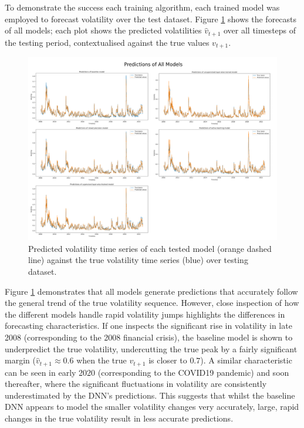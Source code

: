 \documentclass[a4paper, 11pt]{report}
\begin{document}
    To demonstrate the success each training algorithm, each trained model was employed to forecast volatility over the test dataset. Figure \ref{fig: predictions} shows the forecasts of all models; each plot shows the predicted volatilities $\hat{v}_{t+1}$ over all timesteps of the testing period, contextualised against the true values $v_{t+1}$.


    \begin{figure}[ht!]
        \centering
        \includegraphics[width=\textwidth]{results/all-predictions.png}
        \caption{\centering Predicted volatility time series of each tested model (orange dashed line) against the true volatility time series (blue) over testing dataset.}
        \label{fig: predictions}
    \end{figure}


    Figure \ref{fig: predictions} demonstrates that all models  generate predictions that accurately follow the general trend of the true volatility sequence. However, close inspection of how the different models handle rapid volatility jumps highlights the differences in forecasting characteristics. If one inspects the significant rise in volatility in late 2008 (corresponding to the 2008 financial crisis), the baseline model is shown to underpredict the true volatility, undercutting the true peak by a fairly significant margin ($\hat{v}_{t+1} \approx 0.6$ when the true $v_{t+1}$ is closer to $0.7$). A similar characteristic can be seen in early 2020 (corresponding to the COVID19 pandemic) and soon thereafter, where the significant fluctuations in volatility are consistently underestimated by the DNN's predictions. This suggests that whilst the baseline DNN appears to model the smaller volatility changes very accurately, large, rapid changes in the true volatility result in less accurate predictions. 
\end{document}
